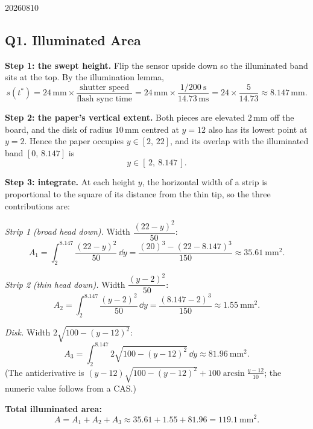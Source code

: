 \begin{solution}{20260810}

\subsection*{Q1. Illuminated Area}

\textbf{Step 1: the swept height.}  Flip the sensor upside down so the illuminated band sits at the top.  By the illumination lemma,
\[
s(t^{\ast}) = 24\,\mathrm{mm}\times\frac{\text{shutter speed}}{\text{flash sync time}}
           = 24\,\mathrm{mm}\times\frac{1/200\ \mathrm{s}}{14.73\,\mathrm{ms}}
           = 24\times\frac{5}{14.73}
           \approx 8.147\,\mathrm{mm}.
\]

\textbf{Step 2: the paper's vertical extent.}  Both pieces are elevated $2\,\mathrm{mm}$ off the board, and the disk of radius $10\,\mathrm{mm}$ centred at $y = 12$ also has its lowest point at $y = 2$.  Hence the paper occupies $y \in [2,\,22]$, and its overlap with the illuminated band $[0,\,8.147]$ is
\[
  y \in [\,2,\ 8.147\,].
\]

\textbf{Step 3: integrate.}  At each height $y$, the horizontal width of a strip is proportional to the square of its distance from the thin tip, so the three contributions are:

\emph{Strip 1 (broad head down).}  Width $\dfrac{(22-y)^{2}}{50}$:
\[
  A_{1} = \int_{2}^{8.147} \frac{(22-y)^{2}}{50}\,\dd y
        = \frac{(20)^{3}-(22-8.147)^{3}}{150}
        \approx 35.61\ \mathrm{mm}^{2}.
\]

\emph{Strip 2 (thin head down).}  Width $\dfrac{(y-2)^{2}}{50}$:
\[
  A_{2} = \int_{2}^{8.147} \frac{(y-2)^{2}}{50}\,\dd y
        = \frac{(8.147-2)^{3}}{150}
        \approx 1.55\ \mathrm{mm}^{2}.
\]

\emph{Disk.}  Width $2\sqrt{100-(y-12)^{2}}$:
\[
  A_{3} = \int_{2}^{8.147} 2\sqrt{100-(y-12)^{2}}\,\dd y
        \approx 81.96\ \mathrm{mm}^{2}.
\]
(The antiderivative is $(y-12)\sqrt{100-(y-12)^{2}}+100\arcsin\frac{y-12}{10}$; the numeric value follows from a CAS.)

\textbf{Total illuminated area:}
\[
  \boxed{A = A_{1}+A_{2}+A_{3} \approx 35.61 + 1.55 + 81.96
           = 119.1\ \mathrm{mm}^{2}}.
\]

\end{solution}


